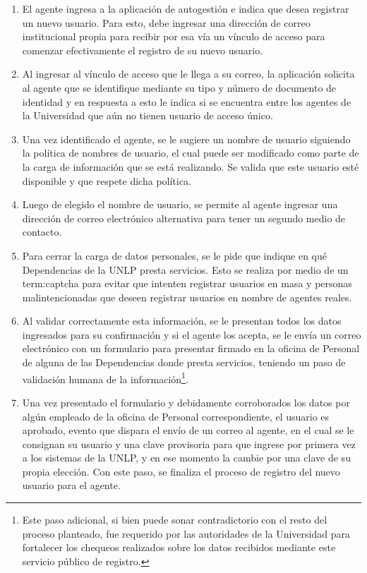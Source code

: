 \begin{enumerate}
  \item El agente ingresa a la aplicación de autogestión e indica que desea registrar un nuevo usuario. Para esto, debe ingresar una dirección de correo institucional propia para recibir por esa vía un vínculo de acceso para comenzar efectivamente el registro de su nuevo usuario.

  \item Al ingresar al vínculo de acceso que le llega a su correo, la aplicación solicita al agente que se identifique mediante su tipo y número de documento de identidad y en respuesta a esto le indica si se encuentra entre los agentes de la Universidad que aún no tienen usuario de acceso único.

  \item Una vez identificado el agente, se le sugiere un nombre de usuario siguiendo la política de nombres de usuario, el cual puede ser modificado como parte de la carga de información que se está realizando. Se valida que este usuario esté disponible y que respete dicha política.

  \item Luego de elegido el nombre de usuario, se permite al agente ingresar una dirección de correo electrónico alternativa para tener un segundo medio de contacto.

  \item Para cerrar la carga de datos personales, se le pide que indique en qué Dependencias de la UNLP presta servicios. Esto se realiza por medio de un \gls{term:captcha} para evitar  que intenten registrar usuarios en masa y personas malintencionadas que deseen registrar usuarios en nombre de agentes reales.

  \item Al validar correctamente esta información, se le presentan todos los datos ingresados para su confirmación y si el agente los acepta, se le envía un correo electrónico con un formulario para presentar firmado en la oficina de Personal de alguna de las Dependencias donde presta servicios, teniendo un paso de validación humana de la información\footnote{Este paso adicional, si bien puede sonar contradictorio con el resto del proceso  planteado, fue requerido por las autoridades de la Universidad para fortalecer los chequeos realizados sobre los datos recibidos mediante este servicio público de registro.}.

  \item Una vez presentado el formulario y debidamente corroborados los datos por algún empleado de la oficina de Personal correspondiente, el usuario es aprobado, evento que dispara el envío de un correo al agente, en el cual se le consignan su usuario y una clave provisoria para que ingrese por primera vez a los sistemas de la UNLP, y en ese momento la cambie por una clave de su propia elección. Con este paso, se finaliza el proceso de registro del nuevo usuario para el agente.
\end{enumerate}

